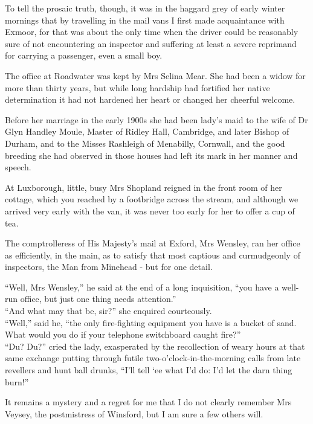 To tell the prosaic truth, though, it was in the haggard grey of early winter mornings that by travelling in the mail vans I first made acquaintance with Exmoor, for that was about the only time when the driver could be reasonably sure of not encountering an inspector and suffering at least a severe reprimand for carrying a passenger, even a small boy. 

The office at Roadwater was kept by Mrs Selina Mear. She had been a widow for more than thirty years, but while long hardship had fortified her native determination it had not hardened her heart or changed her cheerful welcome. 

Before her marriage in the early 1900s she had been lady’s maid to the wife of Dr Glyn Handley Moule, Master of Ridley Hall, Cambridge, and later Bishop of Durham, and to the Misses Rashleigh of Menabilly, Cornwall, and the good breeding she had observed in those houses had left its mark in her manner and speech.
	
At Luxborough, little, busy Mrs Shopland reigned in the front room of her cottage, which you reached by a footbridge across the stream, and although we arrived very early with the van, it was never too early for her to offer a cup of tea.

	The comptrolleress of His Majesty’s mail at Exford, Mrs Wensley, ran her office as efficiently, in the main, as to satisfy that most captious and curmudgeonly of inspectors, the Man from Minehead - but for one detail.
	
“Well, Mrs Wensley,” he said at the end of a long inquisition, “you have a well-run office, but just one thing needs attention.”\\
	“And what may that be, sir?” she enquired courteously.\\
	“Well,” said he, “the only fire-fighting equipment you have is a bucket of sand. What would you do if your telephone switchboard caught fire?”\\
	“Du? Du?” cried the lady, exasperated by the recollection of weary hours at that same exchange putting through futile two-o’clock-in-the-morning calls from late revellers and hunt ball drunks, “I’ll tell ‘ee what I’d do: I’d let the darn thing burn!”

It remains a mystery and a regret for me that I do not clearly remember Mrs Veysey, the postmistress of Winsford, but I am sure a few others will.